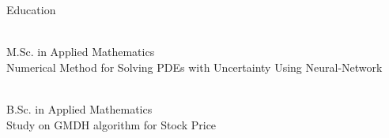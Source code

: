 \documentclass{resume} %
\begin{document}


\begin{rSection}{Education}

	 \\%
	M.Sc. in Applied Mathematics \smallskip \\
	Numerical Method for Solving PDEs with Uncertainty Using Neural-Network 
	
	\\ %
	B.Sc. in Applied Mathematics \smallskip \\
	Study on GMDH algorithm for Stock Price
\end{rSection}
\end{document}
